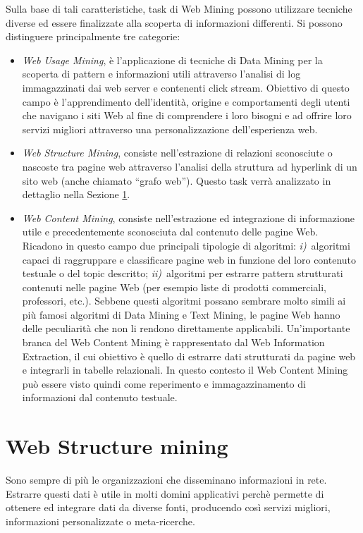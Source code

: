Sulla base di tali caratteristiche, task di Web Mining possono utilizzare tecniche diverse ed essere finalizzate alla scoperta di informazioni differenti. Si possono distinguere principalmente tre categorie:
\begin{itemize}
\item \textit{Web Usage Mining}, è l’applicazione di tecniche di Data Mining per la scoperta di pattern e informazioni utili attraverso l'analisi di log immagazzinati dai web server e contenenti click stream. 
Obiettivo di questo campo è l'apprendimento dell'identità, origine e comportamenti degli utenti che navigano i siti Web al fine di comprendere i loro bisogni e ad offrire loro servizi migliori attraverso una personalizzazione dell'esperienza web.
\item \textit{Web Structure Mining}, consiste nell'estrazione di relazioni sconosciute o nascoste tra pagine web attraverso l'analisi della struttura ad hyperlink di un sito web (anche chiamato ``grafo web''). Questo task verrà analizzato in dettaglio nella Sezione \ref{subsec:webstructure}.
\item \textit{Web Content Mining}, consiste nell'estrazione ed integrazione di informazione utile e precedentemente sconosciuta dal contenuto delle pagine Web. Ricadono in questo campo due principali tipologie di algoritmi: \textit{i)}~algoritmi capaci di raggruppare e classificare pagine web in funzione del loro contenuto testuale o del topic descritto; \textit{ii)}~algoritmi per estrarre pattern strutturati contenuti nelle pagine Web (per esempio liste di prodotti commerciali, professori, etc.).  
Sebbene questi algoritmi possano sembrare molto simili ai più famosi algoritmi di Data Mining e Text Mining, le pagine Web hanno delle peculiarità che non li  rendono direttamente applicabili. Un'importante branca del Web Content Mining è rappresentato dal Web Information Extraction, il cui obiettivo è quello di estrarre dati strutturati da pagine web e integrarli in tabelle relazionali. In questo contesto il Web Content Mining può essere visto quindi come reperimento e immagazzinamento di informazioni dal contenuto testuale.
\end{itemize}


\section{Web Structure mining}
\label{subsec:webstructure}
Sono sempre di più le organizzazioni che disseminano informazioni in rete. Estrarre questi dati è utile in molti domini applicativi perchè permette di ottenere ed integrare dati da diverse fonti, producendo così servizi migliori, informazioni personalizzate o meta-ricerche.

